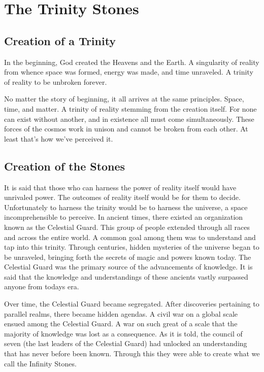 \chapter{The Trinity Stones}

\section{Creation of a Trinity}

\begin{quotebox}
	In the beginning, God created the Heavens and the Earth. A singularity of reality from whence space was formed, energy was made, and time unraveled. A trinity of reality to be unbroken forever.
\end{quotebox}

No matter the story of beginning, it all arrives at the same principles. Space, time, and matter. A trinity of reality stemming from the creation itself. For none can exist without another, and in existence all must come simultaneously. These forces of the cosmos work in unison and cannot be broken from each other. At least that's how we've perceived it.

\section{Creation of the Stones}

It is said that those who can harness the power of reality itself would have unrivaled power. The outcomes of reality itself would be for them to decide. Unfortunately to harness the trinity would be to harness the universe, a space incomprehensible to perceive. In ancient times, there existed an organization known as the Celestial Guard. This group of people extended through all races and across the entire world. A common goal among them was to understand and tap into this trinity. Through centuries, hidden mysteries of the universe began to be unraveled, bringing forth the secrets of magic and powers known today. The Celestial Guard was the primary source of the advancements of knowledge. It is said that the knowledge and understandings of these ancients vastly surpassed anyone from todays era. 

Over time, the Celestial Guard became segregated. After discoveries pertaining to parallel realms, there became hidden agendas. A civil war on a global scale ensued among the Celestial Guard. A war on such great of a scale that the majority of knowledge was lost as a consequence. As it is told, the council of seven (the last leaders of the Celestial Guard) had unlocked an understanding that has never before been known. Through this they were able to create what we call the Infinity Stones. 

